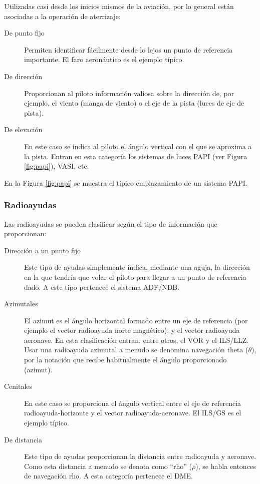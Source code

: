 \documentclass[a4paper,12pt,twoside]{article}
\begin{document}
Utilizadas casi desde los inicios mismos de la aviaci\'on, por lo general est\'an asociadas a la operaci\'on de aterrizaje:
\begin{description}
\item [De punto fijo] Permiten identificar f\'acilmente desde lo lejos un punto de referencia importante. El faro aeron\'autico es el ejemplo t\'ipico.

    \item [De direcci\'on] Proporcionan al piloto informaci\'on valiosa sobre la direcci\'on de, por ejemplo, el viento (manga de viento) o el eje de la pista (luces de eje de pista).

    \item [De elevaci\'on] En este caso se indica al piloto el \'angulo vertical con el que se aproxima a la pista. Entran en esta categor\'ia los sistemas de luces PAPI (ver Figura \ref{fig:papi}), VASI, etc.

\end{description}
     

En la Figura \ref{fig:papi} se muestra el t\'ipico emplazamiento de un sistema PAPI. 



\subsubsection{Radioayudas}

Las radioayudas se pueden clasificar seg\'un el tipo de informaci\'on que proporcionan:

\begin{description}
\item [Direcci\'on a un punto fijo] Este tipo de ayudas simplemente indica, mediante una aguja, la direcci\'on en la que tendr\'ia que volar el piloto para llegar a un punto de referencia dado. A este tipo pertenece el sistema ADF/NDB.

    \item [Azimutales] El azimut es el \'angulo horizontal formado entre un eje de referencia (por ejemplo el vector radioayuda norte magn\'etico), y el vector radioayuda aeronave. En esta clasificaci\'on entran, entre otros, el VOR y el ILS/LLZ.
      Usar una radioayuda azimutal a menudo se de\-no\-mi\-na navegaci\'on theta ($\theta$), por la notaci\'on que recibe habitualmente el \'angulo proporcionado (azimut).

    \item [Cenitales] En este caso se proporciona el \'angulo vertical entre el eje de referencia radioayuda-horizonte y el vector radioayuda-aeronave. El ILS/GS es el ejemplo t\'ipico.

    \item [De distancia] Este tipo de ayudas proporcionan la distancia entre radioayuda y aeronave. Como esta distancia a menudo se denota como ``rho'' ($\rho$), se habla entonces de navegaci\'on rho. A esta categor\'ia pertenece el DME.

\end{description}
     
\end{document}
